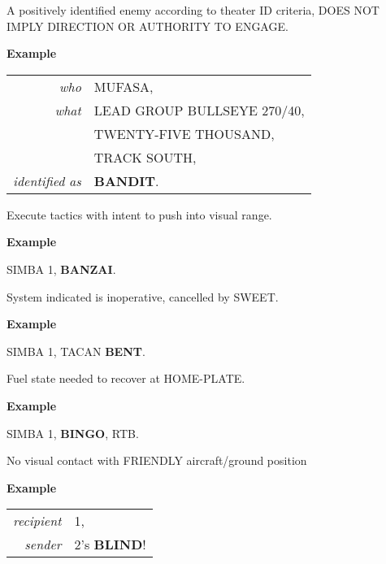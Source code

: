 \begin{tcoloritemize}
    \blueitem[BANDIT]
    A positively identified enemy according to theater ID criteria, DOES NOT IMPLY DIRECTION OR AUTHORITY TO ENGAGE.

    \medskip
    \textbf{Example}
    \begin{center}
        \begin{tabular}{>{\itshape}r l}
            who & MUFASA, \\
            what & LEAD GROUP BULLSEYE 270/40, \\
            & TWENTY-FIVE THOUSAND, \\
            & TRACK SOUTH,\\
            identified as & \textbf{BANDIT}. \\
        \end{tabular}
    \end{center}

    \blueitem[BANZAI]
    Execute tactics with intent to push into visual range.

    \medskip
    \textbf{Example}
    \begin{center}
        \begin{minipage}{0.9\textwidth}
            SIMBA 1, \textbf{BANZAI}.
        \end{minipage}
    \end{center}

    \blueitem[BENT]
    System indicated is inoperative, cancelled by SWEET.

    \medskip
    \textbf{Example}
    \begin{center}
        \begin{minipage}{0.9\textwidth}
            SIMBA 1, TACAN \textbf{BENT}.
        \end{minipage}
    \end{center}

    \blueitem[BINGO]
    Fuel state needed to recover at HOME-PLATE.

    \medskip
    \textbf{Example}
    \begin{center}
        \begin{minipage}{0.9\textwidth}
            SIMBA 1, \textbf{BINGO}, RTB.
        \end{minipage}
    \end{center}

    \blueitem[BLIND]
    No visual contact with FRIENDLY aircraft/ground position

    \medskip
    \textbf{Example}
    \begin{center}
        \begin{tabular}{>{\itshape}r l}
            recipient & 1, \\
            sender & 2's \textbf{BLIND}! \\
        \end{tabular}
    \end{center}


\end{tcoloritemize}
